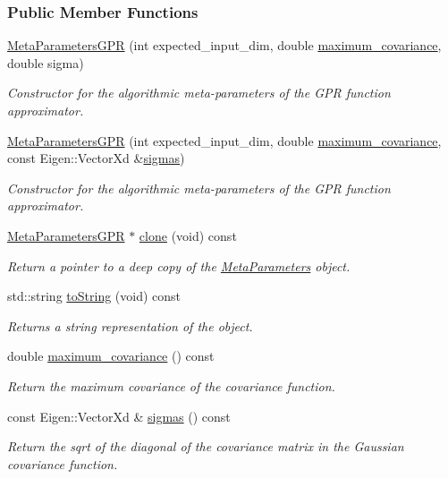 \subsubsection*{Public Member Functions}
\begin{DoxyCompactItemize}
\item 
\hyperlink{classDmpBbo_1_1MetaParametersGPR_a5e775025d3edb500d40a7bd01364bdd3}{Meta\+Parameters\+G\+P\+R} (int expected\+\_\+input\+\_\+dim, double \hyperlink{classDmpBbo_1_1MetaParametersGPR_ae6f4fc553e04b571bd7349314c4e7cc3}{maximum\+\_\+covariance}, double sigma)
\begin{DoxyCompactList}\small\item\em Constructor for the algorithmic meta-\/parameters of the G\+P\+R function approximator. \end{DoxyCompactList}\item 
\hyperlink{classDmpBbo_1_1MetaParametersGPR_a355434471211dc4704a1bd59d188d182}{Meta\+Parameters\+G\+P\+R} (int expected\+\_\+input\+\_\+dim, double \hyperlink{classDmpBbo_1_1MetaParametersGPR_ae6f4fc553e04b571bd7349314c4e7cc3}{maximum\+\_\+covariance}, const Eigen\+::\+Vector\+Xd \&\hyperlink{classDmpBbo_1_1MetaParametersGPR_ac501a02ed6a8aac81a973675f0c15a93}{sigmas})
\begin{DoxyCompactList}\small\item\em Constructor for the algorithmic meta-\/parameters of the G\+P\+R function approximator. \end{DoxyCompactList}\item 
\hyperlink{classDmpBbo_1_1MetaParametersGPR}{Meta\+Parameters\+G\+P\+R} $\ast$ \hyperlink{classDmpBbo_1_1MetaParametersGPR_af525db8d97ff76f7c9b210a1c3ef2d87}{clone} (void) const 
\begin{DoxyCompactList}\small\item\em Return a pointer to a deep copy of the \hyperlink{classDmpBbo_1_1MetaParameters}{Meta\+Parameters} object. \end{DoxyCompactList}\item 
std\+::string \hyperlink{classDmpBbo_1_1MetaParametersGPR_a1aca816b42cf0d36118be0ab91120d77}{to\+String} (void) const 
\begin{DoxyCompactList}\small\item\em Returns a string representation of the object. \end{DoxyCompactList}\item 
double \hyperlink{classDmpBbo_1_1MetaParametersGPR_ae6f4fc553e04b571bd7349314c4e7cc3}{maximum\+\_\+covariance} () const 
\begin{DoxyCompactList}\small\item\em Return the maximum covariance of the covariance function. \end{DoxyCompactList}\item 
const Eigen\+::\+Vector\+Xd \& \hyperlink{classDmpBbo_1_1MetaParametersGPR_ac501a02ed6a8aac81a973675f0c15a93}{sigmas} () const 
\begin{DoxyCompactList}\small\item\em Return the sqrt of the diagonal of the covariance matrix in the Gaussian covariance function. \end{DoxyCompactList}\end{DoxyCompactItemize}
